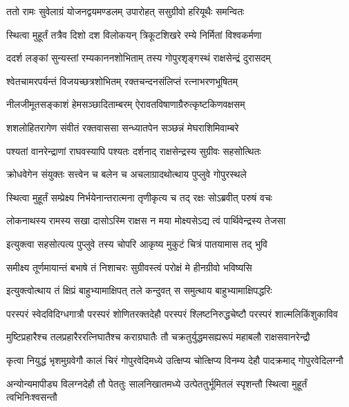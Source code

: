
\twolineshloka
{ततो रामः सुवेलाग्रं योजनद्वयमण्डलम्}
{उपारोहत् ससुग्रीवो हरियूथैः समन्वितः} %

\twolineshloka
{स्थित्वा मुहूर्तं तत्रैव दिशो दश विलोकयन्}
{त्रिकूटशिखरे रम्ये निर्मितां विश्वकर्मणा} %

\twolineshloka
{ददर्श लङ्कां सुन्यस्तां रम्यकाननशोभिताम्}
{तस्य गोपुरशृङ्गस्थं राक्षसेन्द्रं दुरासदम्} %

\twolineshloka
{श्वेतचामरपर्यन्तं विजयच्छत्रशोभितम्}
{रक्तचन्दनसंलिप्तं रत्नाभरणभूषितम्} %

\twolineshloka
{नीलजीमूतसङ्काशं हेमसञ्छादिताम्बरम्}
{ऐरावतविषाणाग्रैरुत्कृष्टकिणवक्षसम्} %

\twolineshloka
{शशलोहितरागेण संवीतं रक्तवाससा}
{सन्ध्यातपेन सञ्छन्नं मेघराशिमिवाम्बरे} %

\twolineshloka
{पश्यतां वानरेन्द्राणां राघवस्यापि पश्यतः}
{दर्शनाद् राक्षसेन्द्रस्य सुग्रीवः सहसोत्थितः} %

\twolineshloka
{क्रोधवेगेन संयुक्तः सत्त्वेन च बलेन च}
{अचलाग्रादथोत्थाय पुप्लुवे गोपुरस्थले} %

\twolineshloka
{स्थित्वा मुहूर्तं सम्प्रेक्ष्य निर्भयेनान्तरात्मना}
{तृणीकृत्य च तद् रक्षः सोऽब्रवीत् परुषं वचः} %

\twolineshloka
{लोकनाथस्य रामस्य सखा दासोऽस्मि राक्षस}
{न मया मोक्ष्यसेऽद्य त्वं पार्थिवेन्द्रस्य तेजसा} %

\twolineshloka
{इत्युक्त्वा सहसोत्पत्य पुप्लुवे तस्य चोपरि}
{आकृष्य मुकुटं चित्रं पातयामास तद् भुवि} %

\twolineshloka
{समीक्ष्य तूर्णमायान्तं बभाषे तं निशाचरः}
{सुग्रीवस्त्वं परोक्षं मे हीनग्रीवो भविष्यसि} %

\twolineshloka
{इत्युक्त्वोत्थाय तं क्षिप्रं बाहुभ्यामाक्षिपत् तले}
{कन्दुवत् स समुत्थाय बाहुभ्यामाक्षिपद्धरिः} %

\twolineshloka
{परस्परं स्वेदविदिग्धगात्रौ परस्परं शोणितरक्तदेहौ}
{परस्परं श्लिष्टनिरुद्धचेष्टौ परस्परं शाल्मलिकिंशुकाविव} %

\twolineshloka
{मुष्टिप्रहारैश्च तलप्रहारैररत्निघातैश्च कराग्रघातैः}
{तौ चक्रतुर्युद्धमसह्यरूपं महाबलौ राक्षसवानरेन्द्रौ} %

\twolineshloka
{कृत्वा नियुद्धं भृशमुग्रवेगौ कालं चिरं गोपुरवेदिमध्ये}
{उत्क्षिप्य चोत्क्षिप्य विनम्य देहौ पादक्रमाद् गोपुरवेदिलग्नौ} %

\twolineshloka
{अन्योन्यमापीड्य विलग्नदेहौ तौ पेततुः सालनिखातमध्ये}
{उत्पेततुर्भूमितलं स्पृशन्तौ स्थित्वा मुहूर्तं त्वभिनिःश्वसन्तौ} %

